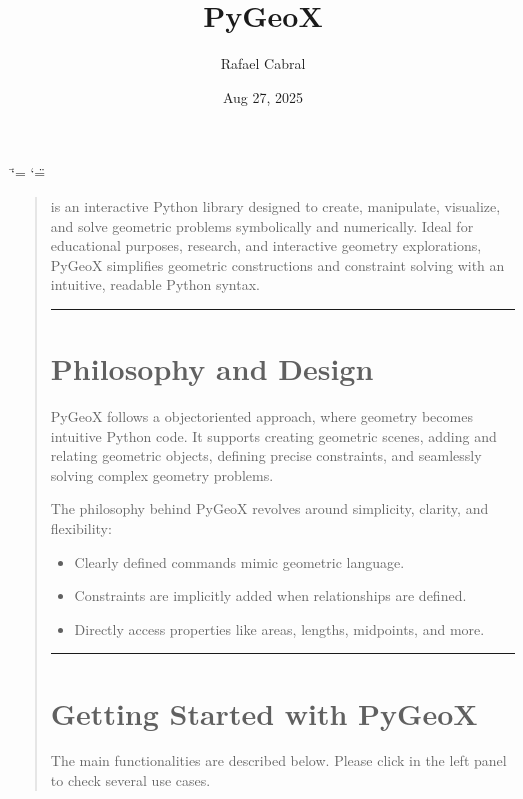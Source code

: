 \documentclass[letterpaper,10pt,english]{sphinxmanual}
\title{PyGeoX}
\date{Aug 27, 2025}
\author{Rafael Cabral}
\begin{document}
\ifdefined\shorthandoff
  \ifnum\catcode`\=\string=\active\shorthandoff{=}\fi
  \ifnum\catcode`\"=\active{}\fi
\fi

\pagestyle{empty}
\sphinxmaketitle
\pagestyle{plain}
\sphinxtableofcontents
\pagestyle{normal}
\label{\detokenize{index::doc}}

\begin{quote}

\sphinxAtStartPar
{} is an interactive Python library designed to create, manipulate, visualize, and solve geometric problems symbolically and numerically. Ideal for educational purposes, research, and interactive geometry explorations, PyGeoX simplifies geometric constructions and constraint solving with an intuitive, readable Python syntax.


\bigskip\hrule\bigskip



\chapter{Philosophy and Design}
\label{\detokenize{index:philosophy-and-design}}
\sphinxAtStartPar
PyGeoX follows a object\sphinxhyphen{}oriented approach, where geometry becomes intuitive Python code. It supports creating geometric scenes, adding and relating geometric objects, defining precise constraints, and seamlessly solving complex geometry problems.

\sphinxAtStartPar
The philosophy behind PyGeoX revolves around simplicity, clarity, and flexibility:
\begin{itemize}
\item {} 
\sphinxAtStartPar
{} Clearly defined commands mimic geometric language.

\item {} 
\sphinxAtStartPar
{} Constraints are implicitly added when relationships are defined.

\item {} 
\sphinxAtStartPar
{} Directly access properties like areas, lengths, midpoints, and more.

\end{itemize}


\bigskip\hrule\bigskip



\chapter{Getting Started with PyGeoX}
\label{\detokenize{index:getting-started-with-pygeox}}
\sphinxAtStartPar
The main functionalities are described below. Please click  in the left panel to check several use cases.



\end{quote}
\end{document}
